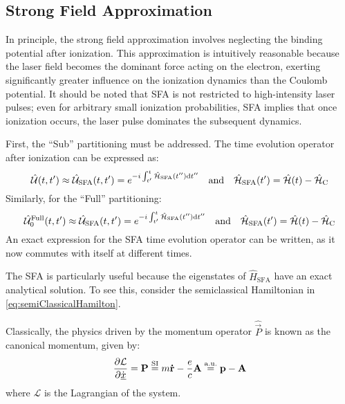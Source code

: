 \subsection{Strong Field Approximation}
In principle, the strong field approximation involves neglecting the binding potential after ionization.
This approximation is intuitively reasonable because the laser field becomes the dominant force acting on the electron, exerting significantly greater influence on the ionization dynamics than the Coulomb potential.
It should be noted that SFA is not restricted to high-intensity laser pulses; even for arbitrary small ionization probabilities, SFA implies that once ionization occurs, the laser pulse dominates the subsequent dynamics.

First, the ``Sub'' partitioning must be addressed.
The time evolution operator after ionization can be expressed as:
\begin{equation*}
    \hat{\mathcal{U}}(t,t') \approx \hat{\mathcal{U}}_{\mathrm{SFA}}(t,t')=e^{-i \int_{t'}^{t} \hat{\mathcal{H}}_{\mathrm{SFA}}(t'') \mathrm{d} t''} \quad \text{and} \quad \hat{\mathcal{H}}_{\mathrm{SFA}}(t') = \hat{\mathcal{H}}(t) - \hat{\mathcal{H}}_{\mathrm{C}}      
\end{equation*}
Similarly, for the ``Full'' partitioning:
\begin{equation*}
    \hat{\mathcal{U}}^{\mathrm{Full}}_0(t,t') \approx \hat{\mathcal{U}}_{\mathrm{SFA}}(t,t')=e^{-i \int_{t'}^{t} \hat{\mathcal{H}}_{\mathrm{SFA}}(t'') \mathrm{d} t''} \quad \text{and} \quad \hat{\mathcal{H}}_{\mathrm{SFA}}(t') = \hat{\mathcal{H}}(t) - \hat{\mathcal{H}}_{\mathrm{C}}
\end{equation*}
An exact expression for the SFA time evolution operator can be written, as it now commutes with itself at different times.

The SFA is particularly useful because the eigenstates of $\hat{H}_{\mathrm{SFA}}$ have an exact analytical solution.
To see this, consider the semiclassical Hamiltonian in \eqref{eq:semiClassicalHamilton}.

Classically, the physics driven by the momentum operator $\hat{\vec{P}}$ is known as the canonical momentum, given by:
\begin{equation}
    \frac{\partial \mathcal{L}}{\partial \dot{\underline{x}}} = \mathbf{P} \stackrel{\mathrm{SI}}{=} m\mathbf{\dot{r}} - \frac{e}{c}\mathbf{A} \stackrel{\mathrm{a.u.}}{=} \mathbf{p} - \mathbf{A}    \label{eq:canonicalMomentum}
\end{equation}
where $\mathcal{L}$ is the Lagrangian of the system.

